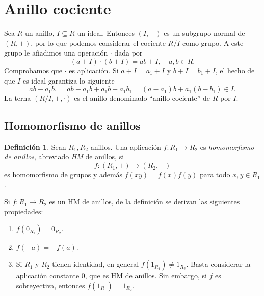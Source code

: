 \documentclass[11pt]{book}
\theoremstyle{definition}
\newtheorem{definition}{Definición}[section]
\begin{document}
\section{Anillo cociente}
Sea $R$ un anillo, $I\subseteq R$ un ideal. Entonces $(I,+)$ es un subgrupo normal de $(R,+)$, por lo que podemos considerar el cociente $R/I$ como grupo. A este grupo le añadimos una operación $\cdot$ dada por\[
(a+I)\cdot (b+I)=ab+I,\quad a,b\in R.
\]Comprobamos que $\cdot$ es aplicación. Si $a+I=a_1+I$ y $b+I=b_1+I$, el hecho de que $I$ es ideal garantiza lo siguiente\[
ab-a_1b_1=ab-a_1b+a_1b-a_1b_1=(a-a_1)b+a_1(b-b_1)\in I.
\]La terna $(R/I,+,\cdot)$ es el anillo denominado ``anillo cociente'' de $R$ por $I$.
\subsection{Homomorfismo de anillos}
\begin{definition}
    Sean $R_1,R_2$ anillos. Una aplicación $f:R_1\longrightarrow R_2$ es \textit{homomorfismo de anillos}, abreviado \textit{HM} de anillos, si\[
    f:(R_1,+)\longrightarrow (R_2,+)
    \]es homomorfismo de grupos y además $f(xy)=f(x)f(y)$ para todo $x,y\in R_1$.
\end{definition}Si $f:R_1\longrightarrow R_2$ es un HM de anillos, de la definición se derivan las siguientes propiedades:\begin{enumerate}
    \item  $f(0_{R_1})=0_{R_2}$.
    \item $f(-a)=-f(a)$.
    \item Si $R_1$ y $R_2$ tienen identidad, en general $f(1_{R_1})\neq 1_{R_2}$. Basta considerar la aplicación constante 0, que es HM de anillos. Sin embargo, si $f$ es sobreyectiva, entonces $f(1_{R_1})=1_{R_2}$.
\end{enumerate}
\end{document}
